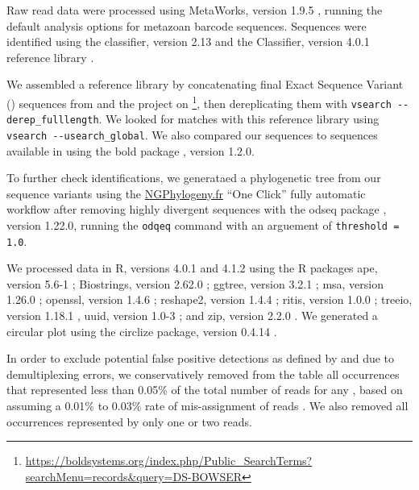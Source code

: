 \begin{multicols}{2}
Raw read data were processed using MetaWorks, version 1.9.5 \citep{PorterHajibabaei2020}, running the default analysis options for metazoan   barcode sequences. Sequences were identified using the  classifier, version 2.13 \citep{Wangetal2007} and the  Classifier, version 4.0.1 reference library \citep{Porter2017, PorterHajibabaei2018}. 

We assembled a reference library by concatenating final Exact Sequence Variant () sequences from \citet{Bowseretal2020, BowserBowser2020} and the  project on \footnote{\url{https://boldsystems.org/index.php/Public_SearchTerms?searchMenu=records&query=DS-BOWSER}}, then dereplicating them with \verb|vsearch --derep_fulllength|. We looked for matches with this reference library using \verb|vsearch --usearch_global|. We also compared our sequences to sequences available in  using the bold package \citep{Chamberlain2021}, version 1.2.0.

To further check identifications, we generataed a phylogenetic tree from our sequence variants using the \href{https://ngphylogeny.fr/}{NGPhylogeny.fr} ``One Click'' fully automatic workflow \citep{CriscuoloGribaldo2010,
DesperGascuel2002,
Lefortetal2015,
Lemoineetal2018,
KatohStandley2013,
JunierZdobnov2010} after removing highly divergent sequences with the odseq package \citep{Jimenez2021}, version 1.22.0, running the \verb|odqeq| command with an arguement of \verb|threshold = 1.0|.

We processed data in R, versions 4.0.1 and 4.1.2 \citep{RCoreTeam2021} using the R packages ape, version 5.6-1 \citep{ParadisSchliep2019}; Biostrings, version 2.62.0 \citep{Pagesetal2021}; ggtree, version 3.2.1 \citep{Yuetal2017, Yuetal2018, Yu2020}; msa, version 1.26.0 \citep{Bodenhoferetal2015}; openssl, version 1.4.6 \citep{Ooms2021}; reshape2, version 1.4.4 \citep{Wickham2007}; ritis, version 1.0.0 \citep{Chamberlain2021b}; treeio, version 1.18.1 \citep{Wangetal2020}, uuid, version 1.0-3 \citep{UrbanekTso2021}; and zip, version 2.2.0 \citep{Csardietal2021}. We generated a circular plot using the circlize package, version 0.4.14 \citep{Guetal2014}.

In order to exclude potential false positive detections as defined by \citet{Mackenzieetal2002} and \citet{Mackenzieetal2006} due to demultiplexing errors, we conservatively removed from the  table all occurrences that represented less than 0.05\% of the total number of reads for any , based on assuming a 0.01\% to 0.03\% rate of mis-assignment of reads \citep{Deineretal2017}. We also removed all occurrences represented by only one or two reads.


\end{multicols}
